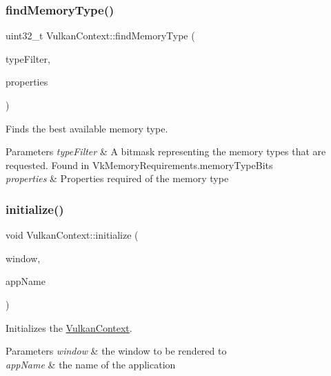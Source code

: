 \subsubsection{\texorpdfstring{findMemoryType()}{findMemoryType()}}
{\footnotesize\ttfamily uint32\+\_\+t Vulkan\+Context\+::find\+Memory\+Type (\begin{DoxyParamCaption}\item[{uint32\+\_\+t}]{type\+Filter,  }\item[{Vk\+Memory\+Property\+Flags}]{properties }\end{DoxyParamCaption})}



Finds the best available memory type. 


\begin{DoxyParams}{Parameters}
{\em type\+Filter} & A bitmask representing the memory types that are requested. Found in Vk\+Memory\+Requirements.\+memory\+Type\+Bits\\
\hline
{\em properties} & Properties required of the memory type \\
\hline
\end{DoxyParams}
\mbox{\label{class_vulkan_context_ad16e483649f2b66fe9659f473765dc35}} 
\subsubsection{\texorpdfstring{initialize()}{initialize()}}
{\footnotesize\ttfamily void Vulkan\+Context\+::initialize (\begin{DoxyParamCaption}\item[{G\+L\+F\+Wwindow $\ast$}]{window,  }\item[{const std\+::string \&}]{app\+Name }\end{DoxyParamCaption})}



Initializes the \mbox{\hyperlink{class_vulkan_context}{Vulkan\+Context}}. 


\begin{DoxyParams}{Parameters}
{\em window} & the window to be rendered to \\
\hline
{\em app\+Name} & the name of the application \\
\hline
\end{DoxyParams}
\mbox{\label{class_vulkan_context_a7f95badc58b644fcc0869e94e2bf6cc0}} 
